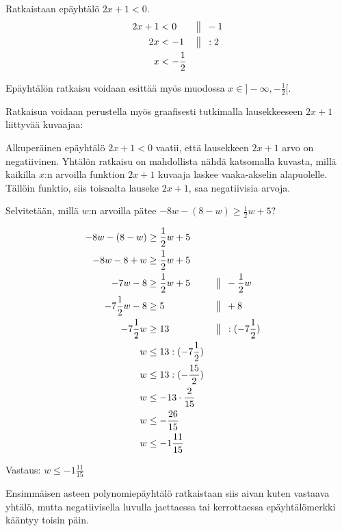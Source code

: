 \begin{esimerkki}
Ratkaistaan epäyhtälö $2x+1 < 0$.
\begin{align*}
2x+1 &< 0 && \big\|\hspace{0.5em} -1 \\
2x &< -1 && \big\|\hspace{0.5em} :2 \\
x &< -\frac{1}{2}
\end{align*}

Epäyhtälön ratkaisu voidaan esittää myös muodossa $x \in ]-\infty, -\frac{1}{2}[$.

Ratkaisua voidaan perustella myös graafisesti tutkimalla lausekkeeseen $2x+1$ liittyvää kuvaajaa:

\begin{kuvaajapohja}{1}{-2}{2}{-2}{2}
\end{kuvaajapohja}

Alkuperäinen epäyhtälö $2x+1<0$ vaatii, että lausekkeen $2x+1$ arvo on negatiivinen. Yhtälön ratkaisu on mahdollista nähdä katsomalla kuvasta, millä kaikilla $x$:n arvoilla funktion $2x+1$ kuvaaja laskee vaaka-akselin alapuolelle. Tällöin funktio, siis toisaalta lauseke $2x+1$, saa negatiivisia arvoja.

\end{esimerkki}

\begin{esimerkki}Selvitetään, millä $w$:n arvoilla pätee
$-8w-(8-w) \geq \frac12 w+5$?

\begin{align*}
-8w-(8-w) &\geq \frac12 w+5 \\
-8w-8+w &\geq \frac12 w+5 \\
-7w-8 &\geq \frac12 w+5  \ \ \ \ \ && \big\|\hspace{0.5em} -\frac12 w \\
-7\frac12 w-8 &\geq 5  \ \ \ \ \ && \big\|\hspace{0.5em} +8 \\
-7\frac12 w &\geq 13  \ \ \ \ \ && \big\|\hspace{0.5em} :(-7\frac12) \\
w &\leq 13:(-7\frac12) \\
w &\leq 13:(-\frac{15}{2}) \\
w &\leq -13\cdot \frac{2}{15} \\
w &\leq -\frac{26}{15} \\
w &\leq -1\frac{11}{15}
\end{align*}

Vastaus: $w \leq -1\frac{11}{15}$
\end{esimerkki}

Ensimmäisen asteen polynomiepäyhtälö ratkaistaan siis aivan kuten vastaava yhtälö, mutta negatiivisella luvulla jaettaessa tai kerrottaessa epäyhtälömerkki kääntyy toisin päin.

